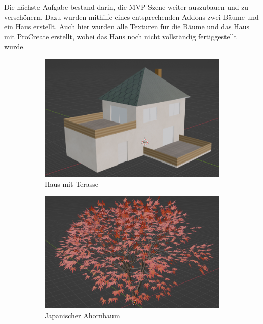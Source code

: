 Die nächste Aufgabe bestand darin, die MVP-Szene weiter auszubauen und zu verschönern. Dazu wurden mithilfe eines entsprechenden Addons zwei Bäume und ein Haus erstellt. Auch hier wurden alle Texturen für die Bäume und das Haus mit ProCreate erstellt, wobei das Haus noch nicht vollständig fertiggestellt wurde.
\begin{figure}[H]

	\begin{subfigure}{0.5\textwidth}
		\includegraphics[height=0.3\pageheight,keepaspectratio]{pics/14}
		\caption{Haus mit Terasse}
	\end{subfigure}
	\begin{subfigure}{0.5\textwidth}
		\includegraphics[height=0.3\pageheight,keepaspectratio]{pics/15}
		\caption{Japanischer Ahornbaum}
	\end{subfigure}
	\begin{subfigure}{0.5\textwidth}

\end{subfigure}
\end{figure}
